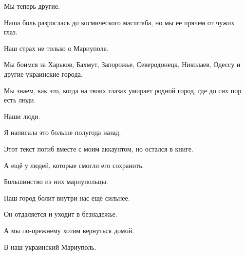 Мы теперь другие. 

Наша боль разрослась до космического масштаба, но мы ее прячем от чужих глаз. 

Наш страх  не только о  Мариуполе. 

Мы боимся  за Харьков, Бахмут,  Запорожье,  Северодонецк, Николаев, Одессу и
другие украинские города. 

Мы знаем, как это, когда на твоих глазах умирает родной город, где до сих пор
есть люди. 

Наши люди.

Я написала это больше полугода назад. 

Этот текст погиб вместе с моим аккаунтом, но остался в книге. 

А ещё у людей, которые смогли его сохранить. 

Большинство из них мариупольцы. 

Наш город болит внутри нас ещё сильнее.  

Он отдаляется и уходит в безнадежье. 

А мы  по-прежнему хотим вернуться домой. 

В наш украинский Мариуполь.
